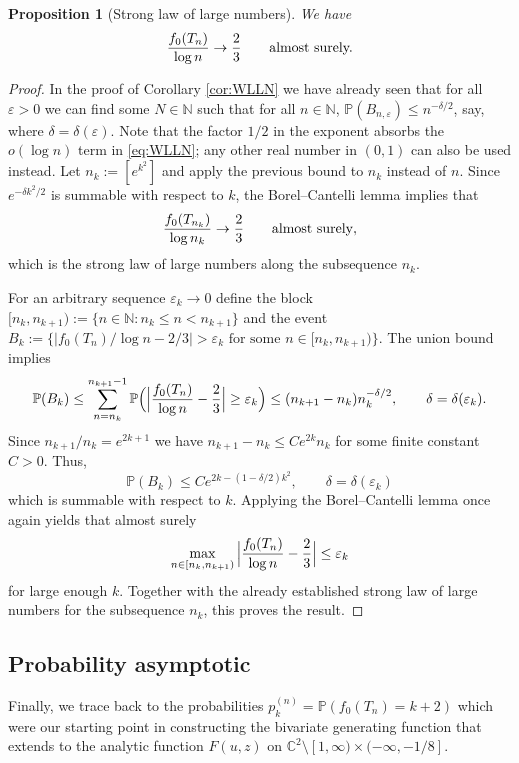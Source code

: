 \documentclass[11pt,a4paper]{article}
\numberwithin{equation}{section}
\newtheorem {proposition}[theorem]{Proposition}
\def\NN{\mathbb{N}}
\def\CC{\mathbb{C}}
\def\PP{\mathbb{P}}
\begin{document}
\begin{proposition}[Strong law of large numbers]
    We have
    $$
    {f_0(T_n)\over\log n}\to\frac{2}{3}\qquad\text{almost surely.}
    $$
\end{proposition}
\begin{proof}
    In the proof of Corollary \ref{cor:WLLN} we have already seen that for all $\varepsilon>0$ we can find some $N\in\NN$ such that for all $n\in\NN$, $\PP(B_{n,\varepsilon})\leq n^{-\delta/2}$, say, where $\delta=\delta(\varepsilon)$. Note that the factor $1/2$ in the exponent absorbs the $o(\log n)$ term in \eqref{eq:WLLN}; any other real number in $(0,1)$ can also be used instead. Let $n_k:=[e^{k^2}]$ and apply the previous bound to $n_k$ instead of $n$. Since $e^{-\delta k^2/2}$ is summable with respect to $k$, the Borel--Cantelli lemma implies that
    $$
    \frac{f_0(T_{n_k})}{\log n_k}\to {2\over 3}\qquad\text{almost surely},
    $$
    which is the strong law of large numbers along the subsequence $n_k$. 
    
    For an arbitrary sequence $\varepsilon_k\to 0$ define the block $[n_k,n_{k+1}):=\{n\in\NN:n_k\leq n<n_{k+1}\}$ and the event $B_k:=\{|f_0(T_n)/\log n-2/3|>\varepsilon_k\text{ for some }n\in[n_k,n_{k+1})\}$. The union bound implies 
    $$
    \PP(B_k) \leq \sum_{n=n_k}^{n_{k+1}-1}\PP\Big(\Big|{f_0(T_n)\over\log n}-\frac{2}{3}\Big|\geq\varepsilon_k\Big) \leq (n_{k+1}-n_k)n_k^{-\delta/2},\qquad \delta=\delta(\varepsilon_k).
    $$
    Since $n_{k+1}/n_k = e^{2k+1}$ we have $n_{k+1}-n_k \leq Ce^{2k}n_k$ for some finite constant $C>0$. Thus,
    $$
    \PP(B_k) \leq Ce^{2k-(1-\delta/2)k^2},\qquad\delta=\delta(\varepsilon_k)
    $$
    which is summable with respect to $k$. Applying the Borel--Cantelli lemma once again yields that almost surely
    $$
    \max_{n\in[n_k,n_{k+1})} \Big|{f_0(T_n)\over\log n}-\frac{2}{3}\Big| \leq \varepsilon_k
    $$
    for large enough $k$. Together with the already established strong law of large numbers for the subsequence $n_k$, this proves the result.
\end{proof}

\subsection{Probability asymptotic}

Finally, we trace back to the probabilities $p_k^{(n)}=\PP(f_0(T_n)=k+2)$ which were our starting point in constructing the bivariate generating function that extends to the analytic function $F(u,z)$ on $\CC^2\setminus [1,\infty)\times (-\infty,-1/8]$.
\end{document}
